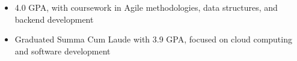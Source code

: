 \par\bigskip
{}
\begin{itemize}
  \item 4.0 GPA, with coursework in Agile methodologies, data structures, and backend development
\end{itemize}
\divider

\begin{itemize}
  \item Graduated Summa Cum Laude with 3.9 GPA, focused on cloud computing and software development
\end{itemize}


